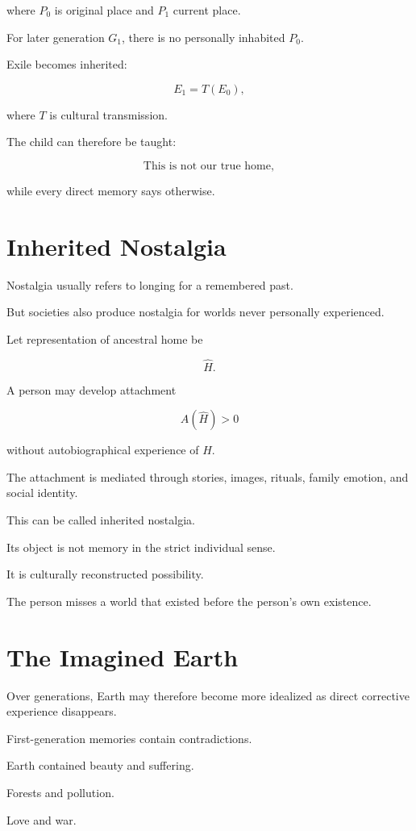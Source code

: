\documentclass[11pt,oneside]{book}
\theoremstyle{definition}
\theoremstyle{remark}
\begin{document}
where \(P_0\) is original place and \(P_1\) current place.

For later generation \(G_1\), there is no personally inhabited \(P_0\).

Exile becomes inherited:

\[
E_1
=
T(E_0),
\]

where \(T\) is cultural transmission.

The child can therefore be taught:

\[
\text{This is not our true home},
\]

while every direct memory says otherwise.

\section{Inherited Nostalgia}

Nostalgia usually refers to longing for a remembered past.

But societies also produce nostalgia for worlds never personally experienced.

Let representation of ancestral home be

\[
\hat{H}.
\]

A person may develop attachment

\[
A(\hat{H})>0
\]

without autobiographical experience of \(H\).

The attachment is mediated through stories, images, rituals, family emotion, and social identity.

This can be called inherited nostalgia.

Its object is not memory in the strict individual sense.

It is culturally reconstructed possibility.

The person misses a world that existed before the person's own existence.

\section{The Imagined Earth}

Over generations, Earth may therefore become more idealized as direct corrective experience disappears.

First-generation memories contain contradictions.

Earth contained beauty and suffering.

Forests and pollution.

Love and war.
\end{document}
